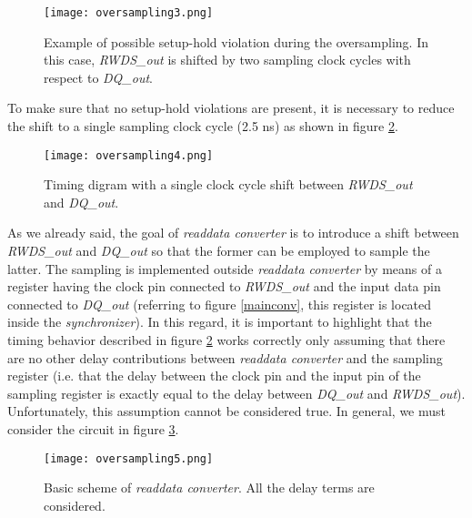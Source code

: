 \documentclass[10pt, english, a4paper, titlepage, oneside]{book}
\begin{document}
\vspace{6mm}
\begin{figure}[H]
    \centering
    \captionsetup{width=13cm}
    \texttt{[image: oversampling3.png]}
    \caption{\centering Example of possible setup-hold violation during the oversampling. In this case, \textit{RWDS\_out} is shifted by two sampling clock cycles with respect to \textit{DQ\_out}.}
    \label{oversampling3}
\end{figure}
\vspace{4mm}
\noindent To make sure that no setup-hold violations are present, it is necessary to reduce the shift to a single sampling clock cycle (2.5 ns) as shown in figure \ref{oversampling4}.
\vspace{6mm}
\begin{figure}[H]
    \centering
    \captionsetup{width=16cm}
    \texttt{[image: oversampling4.png]}
    \caption{\centering Timing digram with a single clock cycle shift between \textit{RWDS\_out} and \textit{DQ\_out}.}
    \label{oversampling4}
\end{figure}
\vspace{4mm}
\noindent As we already said, the goal of \textit{readdata converter} is to introduce a shift between \textit{RWDS\_out} and \textit{DQ\_out} so that the former can be employed to sample the latter. The sampling is implemented outside \textit{readdata converter} by means of a register having the clock pin connected to \textit{RWDS\_out} and the input data pin connected to \textit{DQ\_out} (referring to figure \ref{mainconv}, this register is located inside the \textit{synchronizer}). In this regard, it is important to highlight that the timing behavior described in figure \ref{oversampling4} works correctly only assuming that there are no other delay contributions between \textit{readdata converter} and the sampling register (i.e. that the delay between the clock pin and the input pin of the sampling register is exactly equal to the delay between \textit{DQ\_out} and \textit{RWDS\_out}). Unfortunately, this assumption cannot be considered true. In general, we must consider the circuit in figure \ref{oversampling5}.
\vspace{6mm}
\begin{figure}[H]
    \centering
    \captionsetup{width=18cm}
    \texttt{[image: oversampling5.png]}
    \vspace{4mm}
    \caption{\centering Basic scheme of \textit{readdata converter}. All the delay terms are considered.}
    \label{oversampling5}
\end{figure}
\end{document}
